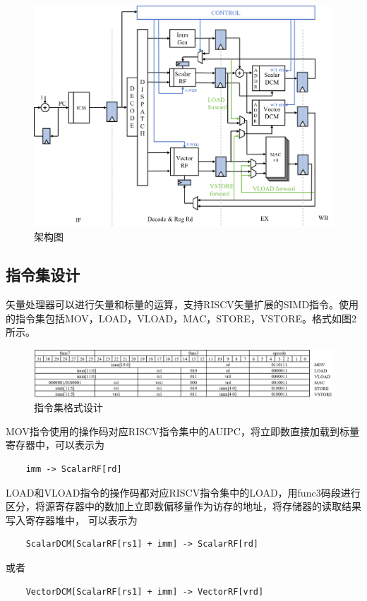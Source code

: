 \documentclass[UTF8]{ctexart}
\begin{document}
\begin{figure}[htbp]
    \centering
    \includegraphics[width=16cm]{pic/Structure.png}
    \caption{架构图}
\end{figure}

\subsection{指令集设计}
矢量处理器可以进行矢量和标量的运算，支持RISCV矢量扩展的SIMD指令。使用的指令集包括MOV，LOAD，VLOAD，MAC，STORE，VSTORE。格式如图2所示。
\begin{figure}[htbp]
    \centering
    \includegraphics[width=16cm]{pic/instr_set.png}
    \caption{指令集格式设计}
\end{figure}

MOV指令使用的操作码对应RISCV指令集中的AUIPC，将立即数直接加载到标量寄存器中，可以表示为
\begin{lstlisting}
    imm -> ScalarRF[rd]
\end{lstlisting}

LOAD和VLOAD指令的操作码都对应RISCV指令集中的LOAD，用func3码段进行区分，将源寄存器中的数加上立即数偏移量作为访存的地址，将存储器的读取结果写入寄存器堆中，
可以表示为
\begin{lstlisting}
    ScalarDCM[ScalarRF[rs1] + imm] -> ScalarRF[rd]
\end{lstlisting}
或者
\begin{lstlisting}
    VectorDCM[ScalarRF[rs1] + imm] -> VectorRF[vrd]
\end{lstlisting}
\end{document}
